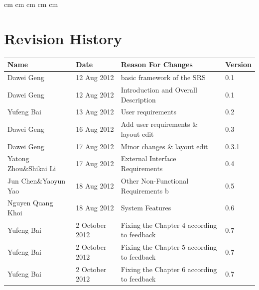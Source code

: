 \documentclass[11pt, a4paper]{report}
\begin{document}
 cm
 cm
 cm
 cm
 cm

\tableofcontents






\clearpage
\section*{Revision History}
\begin{tabular}{| l | l | l | l | }
\hline
Name                        &   Date        	    &	Reason For Changes                  	         &	Version     	\\ \hline
Dawei Geng                  & 	12 Aug 2012    	    & 	basic framework of the SRS     			           &	0.1             \\ \hline
Dawei Geng                  &	12 Aug 2012    	    & 	Introduction and Overall Description             &	0.1             \\ \hline
Yufeng Bai                  &	13 Aug 2012 	    &	User requirements 						         &	0.2  			\\ \hline
Dawei Geng                  &	16 Aug 2012		    &	Add user requirements \& layout edit	          &	0.3 			\\ \hline
Dawei Geng                  &	17 Aug 2012         &	Minor changes \& layout edit			         &	0.3.1 			\\ \hline
Yatong Zhou\&Shikai Li      &	17 Aug 2012		    &		External Interface Requirements &	            0.4			\\ \hline
Jun Chen\&Yaoyun Yao		&	18 Aug 2012		    &		Other Non-Functional Requirements	b&	           0.5			\\ \hline
Nguyen Quang Khoi			&	18 Aug 2012		    &		System Features			                    &	0.6				\\ \hline
Yufeng Bai		            &	2 October 2012		&	Fixing the Chapter 4 according to feedback	     &	0.7	\\ \hline
Yufeng Bai		            &	2 October 2012		&	Fixing the Chapter 5 according to feedback	         &	0.7	\\ \hline
Yufeng Bai		            &	2 October 2012		&	Fixing the Chapter 6 according to feedback	         &	0.7	\\ \hline

\end{tabular}
\end{document}
